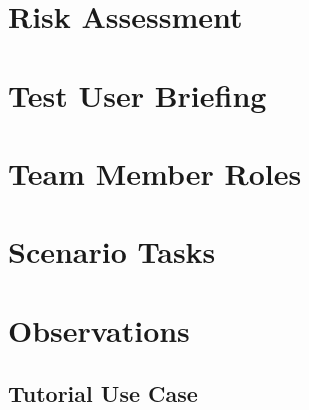 \documentclass{article}
\begin{document}
    \newpage

    \section{Risk Assessment}
    \newpage

    \section{Test User Briefing}
    \newpage

    \section{Team Member Roles}
    \newpage

    \section{Scenario Tasks}
    \newpage

    \section{Observations}
    \subsection{Tutorial Use Case}
\end{document}
